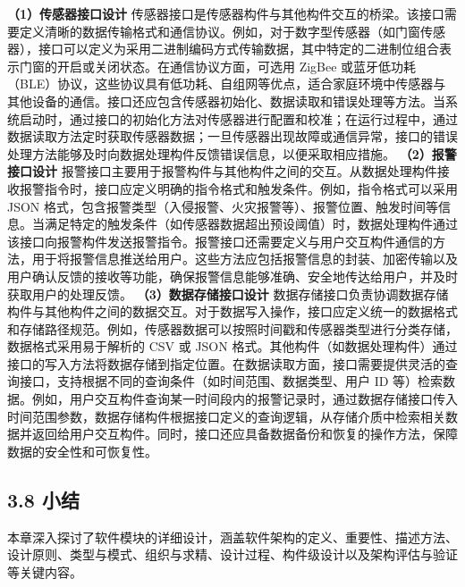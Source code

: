 \textbf{（1）传感器接口设计} 传感器接口是传感器构件与其他构件交互的桥梁。该接口需要定义清晰的数据传输格式和通信协议。例如，对于数字型传感器（如门窗传感器），接口可以定义为采用二进制编码方式传输数据，其中特定的二进制位组合表示门窗的开启或关闭状态。在通信协议方面，可选用 ZigBee 或蓝牙低功耗（BLE）协议，这些协议具有低功耗、自组网等优点，适合家庭环境中传感器与其他设备的通信。接口还应包含传感器初始化、数据读取和错误处理等方法。当系统启动时，通过接口的初始化方法对传感器进行配置和校准；在运行过程中，通过数据读取方法定时获取传感器数据；一旦传感器出现故障或通信异常，接口的错误处理方法能够及时向数据处理构件反馈错误信息，以便采取相应措施。 \textbf{（2）报警接口设计} 报警接口主要用于报警构件与其他构件之间的交互。从数据处理构件接收报警指令时，接口应定义明确的指令格式和触发条件。例如，指令格式可以采用 JSON 格式，包含报警类型（入侵报警、火灾报警等）、报警位置、触发时间等信息。当满足特定的触发条件（如传感器数据超出预设阈值）时，数据处理构件通过该接口向报警构件发送报警指令。报警接口还需要定义与用户交互构件通信的方法，用于将报警信息推送给用户。这些方法应包括报警信息的封装、加密传输以及用户确认反馈的接收等功能，确保报警信息能够准确、安全地传达给用户，并及时获取用户的处理反馈。 \textbf{（3）数据存储接口设计} 数据存储接口负责协调数据存储构件与其他构件之间的数据交互。对于数据写入操作，接口应定义统一的数据格式和存储路径规范。例如，传感器数据可以按照时间戳和传感器类型进行分类存储，数据格式采用易于解析的 CSV 或 JSON 格式。其他构件（如数据处理构件）通过接口的写入方法将数据存储到指定位置。在数据读取方面，接口需要提供灵活的查询接口，支持根据不同的查询条件（如时间范围、数据类型、用户 ID 等）检索数据。例如，用户交互构件查询某一时间段内的报警记录时，通过数据存储接口传入时间范围参数，数据存储构件根据接口定义的查询逻辑，从存储介质中检索相关数据并返回给用户交互构件。同时，接口还应具备数据备份和恢复的操作方法，保障数据的安全性和可恢复性。 \subsection{3.8 小结}\label{ux5c0fux7ed3} 本章深入探讨了软件模块的详细设计，涵盖软件架构的定义、重要性、描述方法、设计原则、类型与模式、组织与求精、设计过程、构件级设计以及架构评估与验证等关键内容。 